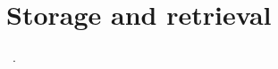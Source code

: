 \chapter{Storage and retrieval}\label{ch:storage}

~\cite{Wang2022, Schulman2017, Mouret2015, Shin2017, Aljundi2016, Nguyen2011, Xie2021}.
